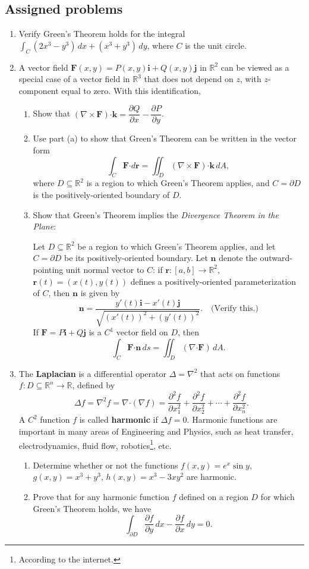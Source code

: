 \documentclass[letterpaper,12pt]{article}
\newcommand{\di}{\displaystyle}
\newcommand{\R}{\mathbb{R}}
\newcommand{\F}{\mathbf{F}}
\newcommand{\dotp}{\boldsymbol{\cdot}}
\renewcommand{\r}{\mathbf{r}}
\newcommand{\n}{\mathbf{n}}
\renewcommand{\i}{\mathbf{i}}
\renewcommand{\j}{\mathbf{j}}
\renewcommand{\k}{\mathbf{k}}
\begin{document}
\subsection*{Assigned problems}
\begin{enumerate}
\item Verify Green's Theorem holds for the integral $\di \int_C (2x^3-y^3)\,dx+(x^3+y^3)\,dy$, where $C$ is the unit circle.
\item A vector field $\F(x,y) = P(x,y)\i+Q(x,y)\j$ in $\R^2$ can be viewed as a special case of a vector field in $\R^3$ that does not depend on $z$, with $z$-component equal to zero. With this identification,
\begin{enumerate}
 \item Show that $(\nabla\times\F)\dotp \k = \dfrac{\partial Q}{\partial x}-\dfrac{\partial P}{\partial y}$.
 \item Use part (a) to show that Green's Theorem can be written in the vector form
\[
 \int_{C} \F\dotp d\r = \iint_D (\nabla\times \F)\dotp \k\,dA,
\]
where $D\subseteq \R^2$ is a region to which Green's Theorem applies, and $C=\partial D$ is the positively-oriented boundary of $D$.
 \item Show that Green's Theorem implies the \textit{Divergence Theorem in the Plane}: 

Let $D\subseteq \R^2$ be a region to which Green's Theorem applies, and let $C=\partial D$ be its positively-oriented boundary. Let $\n$ denote the outward-pointing unit normal vector to $C$: if $\r:[a,b]\to \R^2$, $\r(t)=(x(t),y(t))$ defines a positively-oriented parameterization of $C$, then $\n$ is given by
\[
 \n = \frac{y'(t)\i-x'(t)\j}{\sqrt{(x'(t))^2+(y'(t))^2}}. \quad \text{(Verify this.)}
\]
If $\F=P\i+Q\j$ is a $C^1$ vector field on $D$, then
\[
 \int_C \F\dotp \n\,ds = \iint_D (\nabla \dotp \F)\,dA.
\]
\end{enumerate}
\item The \textbf{Laplacian}  is a differential operator $\Delta = \nabla^2$ that acts on functions $f:D\subseteq \R^n\to \R$, defined by
\[
 \Delta f = \nabla^2f = \nabla\dotp(\nabla f) = \frac{\partial^2 f}{\partial x_1^2}+\frac{\partial^2 f}{\partial x_2^2}+\cdots + \frac{\partial^2 f}{\partial x_n^2}.
\]
A $C^2$ function $f$ is called \textbf{harmonic} if $\Delta f = 0$. Harmonic functions are important in many areas of Engineering and Physics, such as heat transfer, electrodynamics, fluid flow, robotics\footnote{According to the internet.}, etc.
\begin{enumerate}
 \item Determine whether or not the functions $f(x,y)=e^x\sin y$, $g(x,y) = x^3+y^3$, $h(x,y) = x^3-3xy^2$ are harmonic.
 \item Prove that for any harmonic function $f$ defined on a region $D$ for which Green's Theorem holds, we have
\[
 \int_{\partial D}\frac{\partial f}{\partial y}\,dx - \frac{\partial f}{\partial x}\,dy = 0.
\]
 \end{enumerate}

\end{enumerate}
\end{document}
